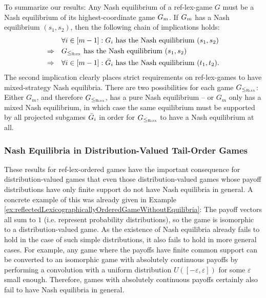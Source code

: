\documentclass[a4paper,DIV=11]{scrreprt}
\let\epsilon\varepsilon
\theoremstyle{definition}
\begin{document}
    To summarize our results: Any Nash equilibrium of a ref-lex-game $G$ must be a Nash equilibrium of its highest-coordinate game $G_{m}$.
    If $G_{m}$ has a Nash equilibrium $(s_1, s_2)$, then the following chain of implications holds:
    \begin{align*}
         &\forall i \in [m - 1]: G_{i} \text{ has the Nash equilibrium } (s_1, s_2) \\
         \Rightarrow\quad &G_{\leq_{\textsc{Rlex}}} \text{ has the Nash equilibrium } (s_1, s_2) \\
         \Rightarrow\quad &\forall i \in [m-1]: \bar{G}_{i} \text{ has the Nash equilibrium } (t_1, t_2).
    \end{align*}
    The second implication clearly places strict requirements on ref-lex-games to have mixed-strategy Nash equilibria. There are two possibilities for each game $G_{\leq_{\textsc{Rlex}}}$: Either $G_m$, and therefore $G_{\leq_{\textsc{Rlex}}}$, has a pure Nash equilibrium -- or $G_m$ only has a mixed Nash equilibrium, in which case the same equilibrium must be supported by all projected subgames $\bar{G}_{i}$ in order for $G_{\leq_{\textsc{Rlex}}}$ to have a Nash equilibrium at all.
    
    
    \subsubsection{Nash Equilibria in Distribution-Valued Tail-Order Games}
    These results for ref-lex-ordered games have the important consequence for distribution-valued games that even those distribution-valued games whose payoff distributions have only finite support do not have Nash equilibria in general.
    A concrete example of this was already given in Example \ref{ex:reflectedLexicographicallyOrderedGameWithoutEquilibria}: The payoff vectors all sum to $1$ (i.e. represent probability distributions), so the game is isomorphic to a distribution-valued game.
    As the existence of Nash equilibria already fails to hold in the case of such simple distributions, it also fails to hold in more general cases.
    For example, any game where the payoffs have finite common support can be converted to an isomorphic game with absolutely continuous payoffs by performing a convolution with a uniform distribution $U([-\epsilon, \epsilon])$ for some $\epsilon$ small enough. Therefore, games with absolutely continuous payoffs certainly also fail to have Nash equilibria in general.
    
\end{document}
